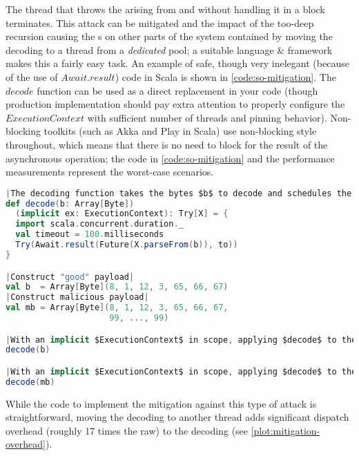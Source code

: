 The thread that throws the  arising from  and  without handling it in a  block terminates. This attack can be mitigated and the impact of the too-deep recursion causing the s on other parts of the system contained by moving the decoding to a thread from a \emph{dedicated} pool; a suitable language \& framework makes this a fairly easy task. An example of safe, though very inelegant (because of the use of $Await.result$) code in Scala is shown in \autoref{code:so-mitigation}. The $decode$ function can be used as a direct replacement in your code (though production implementation should pay extra attention to properly configure the $ExecutionContext$ with sufficient number of threads and pinning behavior). Non-blocking toolkits (such as Akka\cite{akka} and Play\cite{play} in Scala) use non-blocking style throughout, which means that there is no need to block for the result of the asynchronous operation; the code in \autoref{code:so-mitigation} and the performance measurements represent the worst-case scenarios.

\begin{lstlisting}[caption={Stack Overflow Mitigation}, label={code:so-mitigation}, language=Scala, escapechar=|]
|The decoding function takes the bytes $b$ to decode and schedules the decoding in the $ec$. It returns the result of the decoding, but will survive a $StackOverflowError$.|
def decode(b: Array[Byte])
  (implicit ex: ExecutionContext): Try[X] = {
  import scala.concurrent.duration._
  val timeout = 100.milliseconds
  Try(Await.result(Future(X.parseFrom(b)), to))
}

|Construct "good" payload|
val b  = Array[Byte](8, 1, 12, 3, 65, 66, 67)
|Construct malicious payload|
val mb = Array[Byte](8, 1, 12, 3, 65, 66, 67, 
                     99, ..., 99)

|With an implicit $ExecutionContext$ in scope, applying $decode$ to the good payload $b$ returns $Success(X(...))$ in roughly \SI{17}{\milli \second}.|
decode(b)

|With an implicit $ExecutionContext$ in scope, applying $decode$ to the good payload $b$ returns $Failure(TimeoutException)$ after the timeout of \SI{100}{\milli \second} elapses.|
decode(mb)
\end{lstlisting}

While the code to implement the mitigation against this type of attack is straightforward, moving the decoding to another thread adds significant dispatch overhead (roughly 17 times the raw) to the decoding (see \autoref{plot:mitigation-overhead}). 


